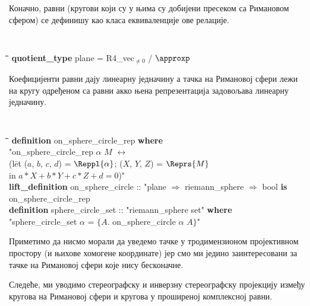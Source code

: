 Коначно, равни (кругови који су у њима су добијени пресеком са
Римановом сфером) се дефинишу као класа еквиваленције ове релације.

{\tt
\begin{tabbing}
\hspace{5mm}\=\hspace{5mm}\=\hspace{5mm}\=\hspace{5mm}\=\hspace{5mm}\=\kill
{\bf quotient\_type} plane = R4\_vec$_{\neq 0}$ / $\approxp$
\end{tabbing}
}

Коефицијенти равни дају линеарну једначину а тачка на Римановој сфери
лежи на кругу одређеном са равни акко њена репрезентација задовољава
линеарну једначину.

{\tt
\begin{tabbing}
\hspace{5mm}\=\hspace{5mm}\=\hspace{5mm}\=\hspace{5mm}\=\hspace{5mm}\=\kill
{\bf definition} on\_sphere\_circle\_rep {\bf where}\\
\>"on\_sphere\_circle\_rep $\alpha$ $M$ $\longleftrightarrow$ \\
\>\>(l\=et ($a$, $b$, $c$, $d$) = $\Reppl{\alpha}$; ($X$, $Y$, $Z$) = $\Reprs{M}$\\
\>\>\>  in $a*X + b*Y + c*Z + d = 0$)"\\
{\bf lift\_definition} on\_sphere\_circle :: "plane $\Rightarrow$ riemann\_sphere $\Rightarrow$ bool {\bf is} \\
\>on\_sphere\_circle\_rep\\
{\bf definition} sphere\_circle\_set :: "riemann\_sphere set" {\bf where}\\
\>"sphere\_circle\_set $\alpha$ = $\{A.$ on\_sphere\_circle $\alpha$ $A\}$"
\end{tabbing}
}
\noindent Приметимо да нисмо морали да уведемо тачке у тродимензионом
пројективном простору (и њихове хомогене координате) јер смо ми једино
заинтересовани за тачке на Римановој сфери које нису бесконачне.

Следеће, ми уводимо стереографску и инверзну стереографску пројекцију
између кругова на Римановој сфери и кругова у проширеној комплексној
равни.

